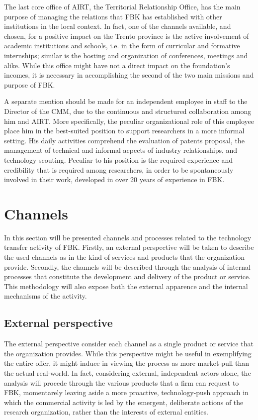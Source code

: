 The last core office of AIRT, the Territorial Relationship Office, has the main purpose of managing the relations that FBK has established with other institutions in the local context. In fact, one of the channels available, and chosen, for a positive impact on the Trento province is the active involvement of academic institutions and schools, i.e. in the form of curricular and formative internships; similar is the hosting and organization of conferences, meetings and alike. While this office might have not a direct impact on the foundation's incomes, it is necessary in accomplishing the second of the two main missions and purpose of FBK.

A separate mention should be made for an independent employee in staff to the Director of the CMM, due to the continuous and structured collaboration among him and AIRT. More specifically, the peculiar organizational role of this employee place him in the best-suited position to support researchers in a more informal setting. His daily activities comprehend the evaluation of patents proposal, the management of technical and informal acpects of industry relationships, and technology scouting. Peculiar to his position is the required experience and credibility that is required among researchers, in order to be spontaneously involved in their work, developed in over 20 years of experience in FBK.

\section{Channels}

In this section will be presented channels and processes related to the technology transfer activity of FBK. Firstly, an external perspective will be taken to describe the used channels as in the kind of services and products that the organization provide. Secondly, the channels will be described through the analysis of internal processes that constitute the development and delivery of the product or service. This methodology will also expose both the external apparence and the internal mechanisms of the activity. 

\subsection{External perspective}

The external perspective consider each channel as a single product or service that the organization provides. While this perspective might be useful in exemplifying the entire offer, it might induce in viewing the process as more market-pull than the actual real-world. In fact, considering external, independent actors alone, the analysis will procede through the various products that a firm can request to FBK, momentarely leaving aside a more proactive, technology-push approach in which the commercial activity is led by the emergent, deliberate actions of the research organization, rather than the interests of external entities.

